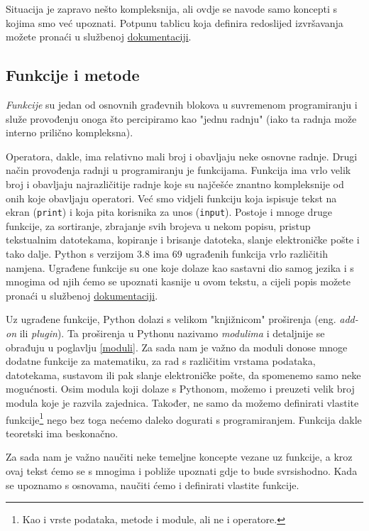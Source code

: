 Situacija je zapravo nešto kompleksnija, ali ovdje se navode samo koncepti s kojima smo već upoznati. Potpunu tablicu koja definira redoslijed izvršavanja možete pronaći u službenoj \href{https://docs.python.org/3/reference/expressions.html#operator-precedence}{dokumentaciji}.


\subsection{Funkcije i metode}

\textit{Funkcije} su jedan od osnovnih građevnih blokova u suvremenom programiranju i služe provođenju onoga što percipiramo kao  "jednu radnju" (iako ta radnja može interno prilično kompleksna).

Operatora, dakle, ima relativno mali broj i obavljaju neke osnovne radnje. Drugi način provođenja radnji u programiranju je funkcijama. Funkcija ima vrlo velik broj i obavljaju najrazličitije radnje koje su najčešće znantno kompleksnije od onih koje obavljaju operatori. Već smo vidjeli funkciju koja ispisuje tekst na ekran (\texttt{print}) i koja pita korisnika za unos (\texttt{input}). Postoje i mnoge druge funkcije, za sortiranje, zbrajanje svih brojeva u nekom popisu, pristup tekstualnim datotekama, kopiranje i brisanje datoteka, slanje elektroničke pošte i tako dalje. Python s verzijom 3.8 ima 69 ugrađenih funkcija vrlo različitih namjena. Ugrađene funkcije su one koje dolaze kao sastavni dio samog jezika i s mnogima od njih ćemo se upoznati kasnije u ovom tekstu, a cijeli popis možete pronaći u službenoj \href{https://docs.python.org/3/library/functions.html}{dokumentaciji}.

Uz ugrađene funkcije, Python dolazi s velikom "knjižnicom"{} proširenja (eng. \textit{add-on} ili \textit{plugin}). Ta proširenja u Pythonu nazivamo \emph{modulima} i detaljnije se obrađuju u poglavlju \ref{moduli}. Za sada nam je važno da moduli donose mnoge dodatne funkcije za matematiku, za rad s različitim vrstama podataka, datotekama, sustavom ili pak slanje elektroničke pošte, da spomenemo samo neke mogućnosti. Osim modula koji dolaze s Pythonom, možemo i preuzeti velik broj modula koje je razvila zajednica. Također, ne samo da možemo definirati vlastite funkcije\footnote{Kao i vrste podataka, metode i module, ali ne i operatore.} nego bez toga nećemo daleko dogurati s programiranjem. Funkcija dakle teoretski ima beskonačno.

Za sada nam je važno naučiti neke temeljne koncepte vezane uz funkcije, a kroz ovaj tekst ćemo se s mnogima i pobliže upoznati gdje to bude svrsishodno. Kada se upoznamo s osnovama, naučiti ćemo i definirati vlastite funkcije.

